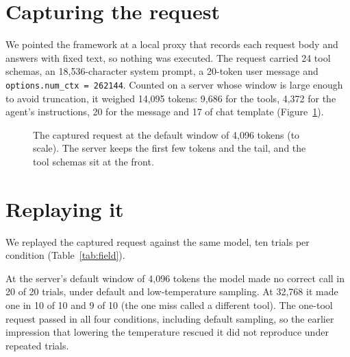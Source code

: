 \documentclass[10pt]{article}
\begin{document}
\section{Capturing the request}

We pointed the framework at a local proxy that records each request body and answers with fixed text, so nothing was executed. The request carried 24 tool schemas, an 18,536-character system prompt, a 20-token user message and \texttt{options.num\_ctx = 262144}. Counted on a server whose window is large enough to avoid truncation, it weighed 14,095 tokens: 9,686 for the tools, 4,372 for the agent's instructions, 20 for the message and 17 of chat template (Figure~\ref{fig:bar}).

\begin{figure}[H]
\centering
{}
\caption{The captured request at the default window of 4,096 tokens (to scale). The server keeps the first few tokens and the tail, and the tool schemas sit at the front.}
\label{fig:bar}
\end{figure}

\section{Replaying it}

We replayed the captured request against the same model, ten trials per condition (Table~\ref{tab:field}).

\fieldtable

At the server's default window of 4,096 tokens the model made no correct call in 20 of 20 trials, under default and low-temperature sampling. At 32,768 it made one in 10 of 10 and 9 of 10 (the one miss called a different tool). The one-tool request passed in all four conditions, including default sampling, so the earlier impression that lowering the temperature rescued it did not reproduce under repeated trials.
\end{document}
